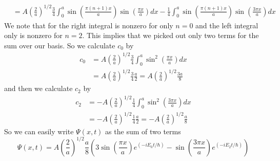 \documentclass[11pt]{article}
\numberwithin{equation}{section}
\begin{document}
\begin{enumerate}[(i)]
\begin{align*}
&= A\left(\frac{2}{a}\right)^{1/2}\frac{3}{4}\int_{0}^{a}\sin\left(\frac{\pi(n+1)x}{a}\right)\sin\left(\frac{\pi x}{a}\right)dx - \frac{1}{4}\int_{0}^{a}\sin\left(\frac{\pi(n+1)x}{a}\right)\sin\left(\frac{3\pi x}{a}\right)dx
\end{align*}
We note that for the right integral is nonzero for only $n=0$ and the left integral only is
nonzero for $n=2$. This implies that we picked out only two terms for the sum over our 
basis. So we calculate $c_0$ by
\begin{align*}
c_0 &= A\left(\frac{2}{a}\right)^{1/2}\frac{3}{4}\int_{0}^{a}\sin^2\left(\frac{\pi x}{a}\right)dx\\
&= A\left(\frac{2}{a}\right)^{1/2}\frac{3}{4}\frac{a}{2} = A\left(\frac{2}{a}\right)^{1/2}\frac{3a}{8}
\end{align*}
and then we calculate $c_2$ by
\begin{align*}
c_2 &= -A\left(\frac{2}{a}\right)^{1/2}\frac{1}{4}\int_{0}^{a}\sin^2\left(\frac{3\pi x}{a}\right)dx\\
&= -A\left(\frac{2}{a}\right)^{1/2}\frac{1}{4}\frac{a}{2} = -A\left(\frac{2}{a}\right)^{1/2}\frac{a}{8}
\end{align*}
So we can easily write $\Psi(x,t)$ as the sum of two terms
$$\Psi(x,t) = A\left(\frac{2}{a}\right)^{1/2}\frac{a}{8}\left(3\sin\left(\frac{\pi x}{a}\right)e^{\left(-iE_0t/\hbar\right)} - \sin\left(\frac{3\pi x}{a}\right)e^{\left(-iE_2t/\hbar\right)}\right)$$


\end{enumerate}
\end{document}
